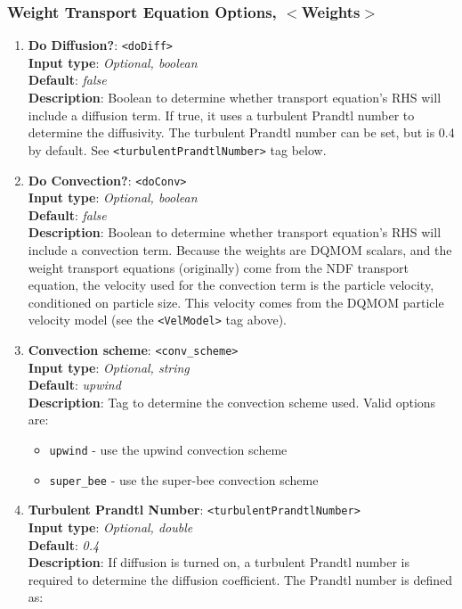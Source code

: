 \subsubsection{Weight Transport Equation Options, $<$Weights$>$}
%
\begin{enumerate}
%
\item {\bf Do Diffusion?}: \verb=<doDiff>= \\
{\bf Input type}: {\it Optional, boolean} \\
{\bf Default}: {\it false} \\
{\bf Description}: Boolean to determine whether transport equation's RHS will include a diffusion term. If true, it uses a turbulent Prandtl number to determine the diffusivity.  The turbulent Prandtl number can be set, but is 0.4 by default.  See \verb=<turbulentPrandtlNumber>= tag below.
%
\item {\bf Do Convection?}: \verb=<doConv>= \\
{\bf Input type}: {\it Optional, boolean} \\
{\bf Default}: {\it false} \\
{\bf Description}: Boolean to determine whether transport equation's RHS will include a convection term. Because the weights are DQMOM scalars, and the weight transport equations (originally) come from the NDF transport equation, the velocity used for the convection term is the particle velocity, conditioned on particle size.  This velocity comes from the DQMOM particle velocity model (see the \verb=<VelModel>= tag above).
%
\item {\bf Convection scheme}: \verb=<conv_scheme>= \\
{\bf Input type}: {\it Optional, string} \\
{\bf Default}: {\it upwind} \\
{\bf Description}: Tag to determine the convection scheme used. Valid options are:
\begin{itemize}
\item \verb=upwind= - use the upwind convection scheme
\item \verb=super_bee= - use the super-bee convection scheme
\end{itemize}
%
\item {\bf Turbulent Prandtl Number}: \verb=<turbulentPrandtlNumber>= \\
{\bf Input type}: {\it Optional, double} \\
{\bf Default}: {\it 0.4} \\
{\bf Description}: If diffusion is turned on, a turbulent Prandtl number is required to determine the diffusion coefficient.  The Prandtl number is defined as:

\end{enumerate}
